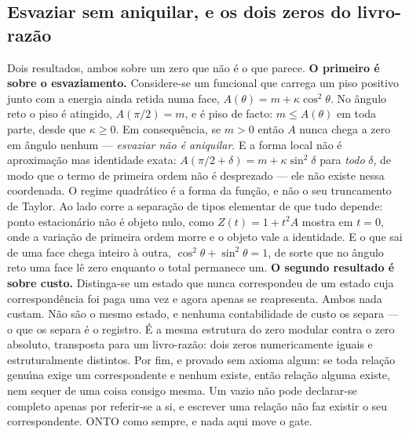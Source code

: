 \documentclass[11pt]{article}
\theoremstyle{definition}\newtheorem{deriv}{Derivação}
\begin{document}
\subsection*{Esvaziar sem aniquilar, e os dois zeros do livro-raz\~ao}Dois resultados, ambos sobre um zero que n\~ao \'e o que parece. \textbf{O primeiro \'e sobre o esvaziamento.} Considere-se um funcional que carrega um piso positivo junto com a energia ainda retida numa face, $A(\theta) = m + \kappa\cos^2\theta$. No \^angulo reto o piso \'e atingido, $A(\pi/2)=m$, e \'e piso de facto: $m \leq A(\theta)$ em toda parte, desde que $\kappa\geq 0$. Em consequ\^encia, se $m>0$ ent\~ao $A$ nunca chega a zero em \^angulo nenhum --- \emph{esvaziar n\~ao \'e aniquilar}. E a forma local n\~ao \'e aproxima\c{c}\~ao mas identidade exata: $A(\pi/2+\delta) = m + \kappa\sin^2\delta$ para \emph{todo} $\delta$, de modo que o termo de primeira ordem n\~ao \'e desprezado --- ele n\~ao existe nessa coordenada. O regime quadr\'atico \'e a forma da fun\c{c}\~ao, e n\~ao o seu truncamento de Taylor. Ao lado corre a separa\c{c}\~ao de tipos elementar de que tudo depende: ponto estacion\'ario n\~ao \'e objeto nulo, como $Z(t)=1+t^2A$ mostra em $t=0$, onde a varia\c{c}\~ao de primeira ordem morre e o objeto vale a identidade. E o que sai de uma face chega inteiro \`a outra, $\cos^2\theta+\sin^2\theta=1$, de sorte que no \^angulo reto uma face l\^e zero enquanto o total permanece um. \textbf{O segundo resultado \'e sobre custo.} Distinga-se um estado que nunca correspondeu de um estado cuja correspond\^encia foi paga uma vez e agora apenas se reapresenta. Ambos nada custam. N\~ao s\~ao o mesmo estado, e nenhuma contabilidade de custo os separa --- o que os separa \'e o registro. \'E a mesma estrutura do zero modular contra o zero absoluto, transposta para um livro-raz\~ao: dois zeros numericamente iguais e estruturalmente distintos. Por fim, e provado sem axioma algum: se toda rela\c{c}\~ao genu\'\i{}na exige um correspondente e nenhum existe, ent\~ao rela\c{c}\~ao alguma existe, nem sequer de uma coisa consigo mesma. Um vazio n\~ao pode declarar-se completo apenas por referir-se a si, e escrever uma rela\c{c}\~ao n\~ao faz existir o seu correspondente. \textsf{ONTO} como sempre, e nada aqui move o gate.
\end{document}
